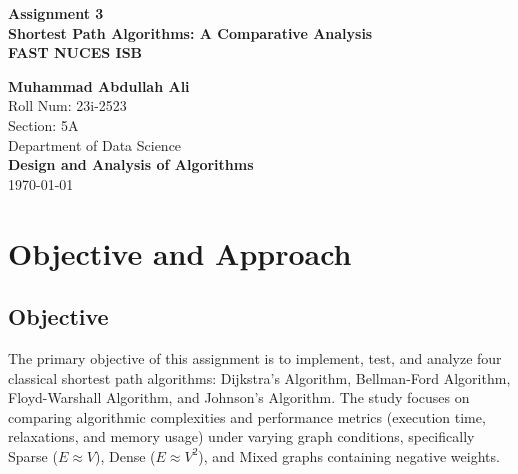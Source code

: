 \documentclass[12pt, a4paper]{article}
\begin{document}
\begin{titlepage}
    \centering
    \vspace*{2cm}
    
    {\Huge \textbf{Assignment 3}}\\[0.5cm]
    {\Large \textbf{Shortest Path Algorithms: A Comparative Analysis}}\\[2cm]
    
    {\Large \textbf{FAST NUCES ISB}}\\[0.5cm]
    \vfill
    
    \textbf{Muhammad Abdullah Ali}\\
    Roll Num: 23i-2523\\
    Section: 5A\\[1cm]
    
    Department of Data Science\\
    \textbf{Design and Analysis of Algorithms}\\[1cm]
    
    \today\\[2cm]
    
    \vspace*{2cm}
\end{titlepage}

\section{Objective and Approach}

\subsection{Objective}
The primary objective of this assignment is to implement, test, and analyze four classical shortest path algorithms: Dijkstra’s Algorithm, Bellman-Ford Algorithm, Floyd-Warshall Algorithm, and Johnson’s Algorithm. The study focuses on comparing algorithmic complexities and performance metrics (execution time, relaxations, and memory usage) under varying graph conditions, specifically Sparse ($E \approx V$), Dense ($E \approx V^2$), and Mixed graphs containing negative weights.
\end{document}
